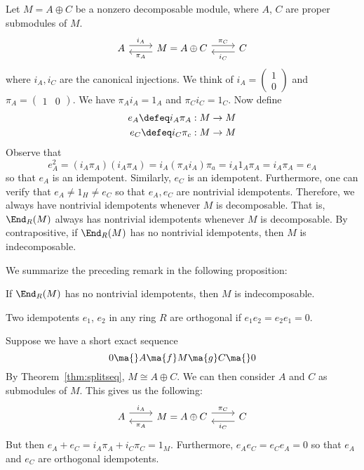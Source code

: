 \begin{rem}
Let $M=A \oplus C$ be a nonzero decomposable module, where $A$, $C$ are proper submodules of $M$.
	\[
	\begin{tikzcd}
A \arrow[yshift=0.75ex]{r}{i_A} & M=A \oplus C \arrow[yshift=-0.75ex]{l}{\pi_A} \arrow[yshift=0.75ex]{r}{\pi_C} & C \arrow[yshift= -0.75ex]{l}{i_C}
	\end{tikzcd}
	\]
where $i_A,i_C$ are the canonical injections. We think of $i_A=\begin{pmatrix} 1 \\ 0 \end{pmatrix}$ and $\pi_A=\begin{pmatrix} 1 & 0 \end{pmatrix}$. We have $\pi_A i_A=1_A$ and $\pi_C i_C=1_C$. Now define
	\[
	\begin{split}
	e_A \defeq i_A \pi_A: M \rightarrow M \\
	e_C \defeq i_C \pi_c: M \rightarrow M
	\end{split}
	\]
Observe that 
	\[
	e_A^2=(i_A\pi_A)( i_A \pi_A)=i_A (\pi_A i_A) \pi_a=i_A 1_A \pi_A=i_A\pi_A=e_A
	\]
so that $e_A$ is an idempotent. Similarly, $e_C$ is an idempotent. Furthermore, one can verify that $e_A \neq 1_H \neq e_C$ so that $e_A,e_C$ are nontrivial idempotents. Therefore, we always have nontrivial idempotents whenever $M$ is decomposable. That is, $\End_R(M)$ always has nontrivial idempotents whenever $M$ is decomposable. By contrapositive, if $\End_R(M)$ has no nontrivial idempotents, then $M$ is indecomposable. 
\end{rem}


We summarize the preceding remark in the following proposition:


\begin{prop}
If $\End_R(M)$ has no nontrivial idempotents, then $M$ is indecomposable. 
\end{prop}


\begin{dfn}
Two idempotents $e_1$, $e_2$ in any ring $R$ are orthogonal if $e_1e_2=e_2e_1=0$.
\end{dfn}


\begin{ex} Suppose we have a short exact sequence
	\[
	0 \ma{} A \ma{f} M \ma{g} C \ma{} 0
	\]
By Theorem~\ref{thm:splitseq}, $M \cong A \oplus C$. We can then consider $A$ and $C$ as submodules of $M$. This gives us the following:
	\[
	\begin{tikzcd}
	A \arrow[yshift=1ex]{r}{i_A} & M=A \oplus C \arrow[yshift=-1ex]{l}{\pi_A} \arrow[yshift=1ex]{r}{\pi_C} & C \arrow[yshift=-1ex]{l}{i_C} 
	\end{tikzcd}
	\]
But then $e_A+e_C=i_A\pi_A+i_C\pi_C=1_M$. Furthermore, $e_Ae_C=e_Ce_A=0$ so that $e_A$ and $e_C$ are orthogonal idempotents. \xqed
\end{ex}


